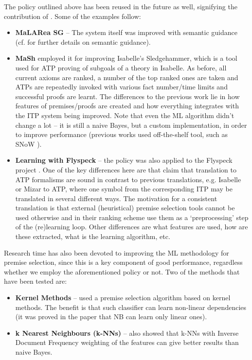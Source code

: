 \documentclass{article}
\begin{document}
The policy outlined above has been reused in the future as well, signifying the
contribution of \cite{MaLARea}. Some of the examples follow:
\begin{itemize}
    \item \textbf{MaLARea SG} \cite{MaLAReaSG} -- The system itself was
        improved with semantic guidance (cf. \cite{SRASS} for further details
        on semantic guidance).
    \item \textbf{MaSh} \cite{MaSh} employed it for improving Isabelle's
        Sledgehammer, which is a tool used for ATP proving of subgoals of
        a theory in Isabelle.  As before, all current axioms are ranked,
        a number of the top ranked ones are taken and ATPs are repeatedly
        invoked with various fact number/time limits and successful proofs are
        learnt. The differences to the previous work lie in how features of
        premises/proofs are created and how everything integrates with the
        ITP system being improved. Note that even the ML algorithm didn't
        change a lot -- it is still a naive Bayes, but a custom
        implementation, in order to improve performance (previous works used
        off-the-shelf tool, such as SNoW \citep{SNoW}).
    \item \textbf{Learning with Flyspeck } -- the policy was also applied to
        the Flyspeck project \citep{FlyspeckProject}. One of the key differences
        here are that \cite{Flyspeck} claim that translation to ATP formalisms
        are sound in contrast to previous translations, e.g. Isabelle or Mizar
        to ATP, where one symbol from the corresponding ITP may be translated
        in several different ways. The motivation for a consistent translation
        is that external (heuristical) premise selection tools cannot be used
        otherwise and in their ranking scheme \cite{Flyspeck} use them as
        a `preprocessing' step of the (re)learning loop. Other differences are
        what features are used, how are these extracted, what is the learning
        algorithm, etc.
\end{itemize}

Research time has also been devoted to improving the ML methodology for
premise selection, since this is a key component of good performance,
regardless whether we employ the aforementioned policy or not. Two of the
methods that have been tested are:
\begin{itemize}
    \item \textbf{Kernel Methods} -- 
        \cite{PremiseSelection} used a premise selection algorithm based on
        kernel methods. The benefit is that such classifier can learn
        non-linear dependencies (it was proved in the paper that NB can learn
        only linear ones). 
    \item \textbf{k Nearest Neighbours (k-NNs)} -- \cite{FlyspeckFeatW} also
        showed that k-NNs with Inverse Document Frequency weighting of the
        features can give better results than naive Bayes. 
\end{itemize}
\end{document}
